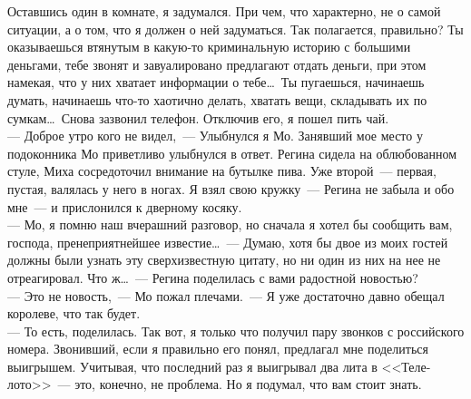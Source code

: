 Оставшись один в комнате, я задумался. При чем, что характерно, не о самой 
ситуации, а о том, что я должен о ней задуматься. Так полагается, правильно? Ты 
оказываешься втянутым в какую-то криминальную историю с большими деньгами, тебе 
звонят и завуалировано предлагают отдать деньги, при этом намекая, что у них 
хватает информации о тебе\ldots\ Ты пугаешься, начинаешь думать, начинаешь 
что-то хаотично делать, хватать вещи, складывать их по сумкам\ldots\ Снова зазвонил 
телефон. Отключив его, я пошел пить чай.\\
--- Доброе утро кого не видел,~--- Улыбнулся я Мо. Занявший мое место у 
подоконника Мо приветливо улыбнулся в ответ. Регина сидела на облюбованном стуле, Миха 
сосредоточил внимание на бутылке пива. Уже второй~--- первая, пустая, валялась 
у него в ногах. Я взял свою кружку~--- Регина не забыла и обо мне~--- и 
прислонился к дверному косяку.\\
--- Мо, я помню наш вчерашний разговор, но сначала я хотел бы сообщить вам, 
господа, пренеприятнейшее известие\ldots~--- Думаю, хотя бы двое из моих 
гостей должны были узнать эту сверхизвестную цитату, но ни один из них на нее не 
отреагировал. Что ж\ldots~--- Регина поделилась с вами радостной новостью?\\
--- Это не новость,~--- Мо пожал плечами.~--- Я уже достаточно давно обещал 
королеве, что так будет. \\
--- То есть, поделилась. Так вот, я только что получил пару звонков с российского 
номера. Звонивший, если я правильно его понял, предлагал мне поделиться 
выигрышем. Учитывая, что последний раз я выигрывал два лита в <<Теле-лото>>~--- 
это, конечно, не проблема. Но я подумал, что вам стоит знать.

